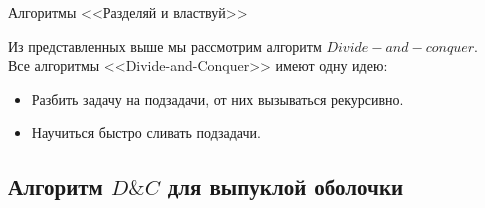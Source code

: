     \begin{frame}{Алгоритмы <<Разделяй и властвуй>>}

        Из представленных выше мы рассмотрим алгоритм $Divide-and-conquer$. \\

        Все алгоритмы <<Divide-and-Conquer>> имеют одну идею:

        \begin{itemize}

            \item Разбить задачу на подзадачи, от них вызываться рекурсивно.

            \item Научиться быстро сливать подзадачи.

        \end{itemize}

    \end{frame}

    \subsection{Алгоритм $D\&C$ для выпуклой оболочки}

